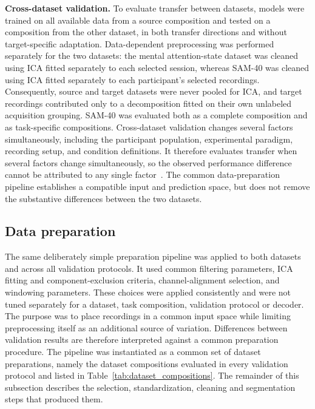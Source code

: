 \documentclass[10pt,letterpaper]{article}
\newcommand{\rev}[1]{#1}
\begin{document}
\textbf{Cross-dataset validation.}
\rev{To evaluate transfer between datasets, models were trained on all available data from a source composition and tested on a composition from the other dataset, in both transfer directions and without target-specific adaptation. Data-dependent preprocessing was performed separately for the two datasets: the mental attention-state dataset was cleaned using ICA fitted separately to each selected session, whereas SAM-40 was cleaned using ICA fitted separately to each participant's selected recordings. Consequently, source and target datasets were never pooled for ICA, and target recordings contributed only to a decomposition fitted on their own unlabeled acquisition grouping. SAM-40 was evaluated both as a complete composition and as task-specific compositions. Cross-dataset validation changes several factors simultaneously, including the participant population, experimental paradigm, recording setup, and condition definitions. It therefore evaluates transfer when several factors change simultaneously, so the observed performance difference cannot be attributed to any single factor~\cite{lan2019domain}. The common data-preparation pipeline establishes a compatible input and prediction space, but does not remove the substantive differences between the two datasets.}

\subsection*{Data preparation}

\rev{The same deliberately simple preparation pipeline was applied to
both datasets and across all validation protocols. It used common filtering
parameters, ICA fitting and component-exclusion criteria, channel-alignment
selection, and windowing parameters. These choices were applied consistently and were not tuned
separately for a dataset, task composition, validation protocol or decoder. The
purpose was to place recordings in a common input space while limiting
preprocessing itself as an additional source of variation. Differences between
validation results are therefore interpreted against a common preparation
procedure. The pipeline was instantiated as a common set of dataset
preparations, namely the dataset compositions evaluated in every validation
protocol and listed in
Table~\ref{tab:dataset_compositions}. The remainder of this subsection
describes the selection, standardization, cleaning and segmentation steps that
produced them.}
\end{document}
